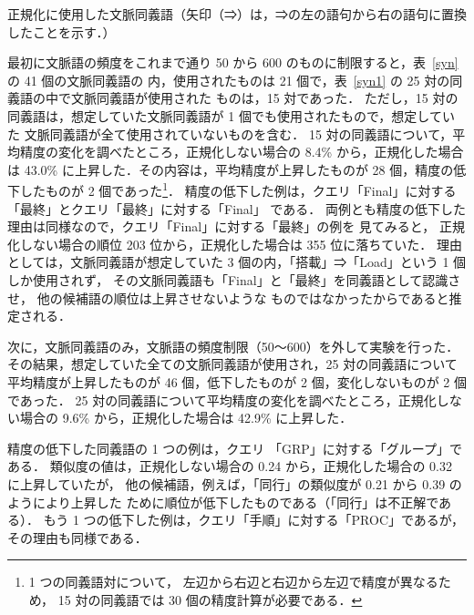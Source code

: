 \documentclass[japanese]{jnlp_1.4}
\begin{document}
\begin{table}[b]
\begin{center}
\label{syn1}

\end{center}
\end{table}
\begin{table}[t]
\begin{center}
\caption{正規化に使用した文脈同義語（矢印（⇒）は，⇒の左の語句から右の語句に置換したことを示す．）}
\label{syn}

\end{center}
\end{table}

最初に文脈語の頻度をこれまで通り 50 から 600 のものに制限すると，表~\ref{syn}の 41 個の文脈同義語の
内，使用されたものは 21 個で，表~\ref{syn1} の 25 対の同義語の中で文脈同義語が使用された
ものは，15 対であった．
ただし，15 対の同義語は，想定していた文脈同義語が 1 個でも使用されたもので，想定していた
文脈同義語が全て使用されていないものを含む．
15 対の同義語について，平均精度の変化を調べたところ，正規化しない場合の 8.4\% から，正規化した場合は 43.0\% に上昇した．その内容は，平均精度が上昇したものが 28 個，精度の低下したものが 2 個であった\footnote{
	1 つの同義語対について，
	左辺から右辺と右辺から左辺で精度が異なるため，
	15 対の同義語では 30 個の精度計算が必要である．
}．
精度の低下した例は，クエリ「Final」に対する「最終」とクエリ「最終」に対する「Final」
である．
両例とも精度の低下した理由は同様なので，クエリ「Final」に対する「最終」の例を
見てみると，
正規化しない場合の順位 203 位から，正規化した場合は 355 位に落ちていた．
理由としては，文脈同義語が想定していた 3 個の内，「搭載」⇒「Load」という 1 個しか使用されず，
その文脈同義語も「Final」と「最終」を同義語として認識させ，
他の候補語の順位は上昇させないような
ものではなかったからであると推定される．

次に，文脈同義語のみ，文脈語の頻度制限（50〜600）を外して実験を行った．
その結果，想定していた全ての文脈同義語が使用され，25 対の同義語について
平均精度が上昇したものが 46 個，低下したものが 2 個，変化しないものが 2 個であった．
25 対の同義語について平均精度の変化を調べたところ，正規化しない場合の 9.6\% から，正規化した場合は 42.9\% に上昇した．

精度の低下した同義語の 1 つの例は，クエリ
「GRP」に対する「グループ」である．
類似度の値は，正規化しない場合の 0.24 から，正規化した場合の 0.32 に上昇していたが，
他の候補語，例えば，「同行」の類似度が 0.21 から 0.39 のようにより上昇した
ために順位が低下したものである（「同行」は不正解である）．
もう 1 つの低下した例は，クエリ「手順」に対する「PROC」であるが，その理由も同様である．
\end{document}
